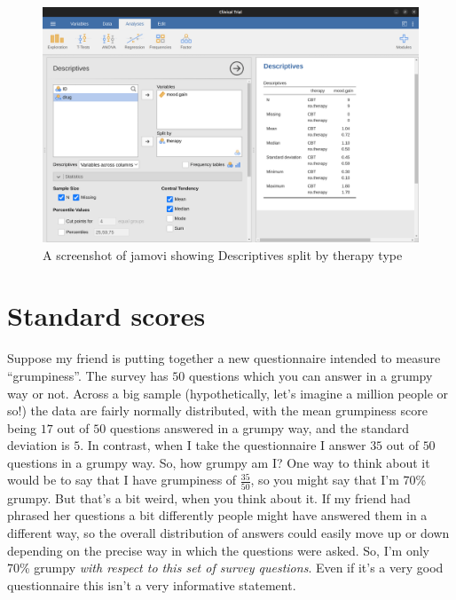 \documentclass[
  a4paper,
]{book}
\begin{document}
\begin{figure}

\includegraphics[width=1\textwidth,height=\textheight]{images/fig4-14.png} \hfill{}

\caption{\label{fig-fig4-14}A screenshot of jamovi showing Descriptives
split by therapy type}

\end{figure}

\hypertarget{sec-Standard-scores}{%
\section{Standard scores}\label{sec-Standard-scores}}

Suppose my friend is putting together a new questionnaire intended to
measure ``grumpiness''. The survey has \(50\) questions which you can
answer in a grumpy way or not. Across a big sample (hypothetically,
let's imagine a million people or so!) the data are fairly normally
distributed, with the mean grumpiness score being \(17\) out of \(50\)
questions answered in a grumpy way, and the standard deviation is \(5\).
In contrast, when I take the questionnaire I answer \(35\) out of \(50\)
questions in a grumpy way. So, how grumpy am I? One way to think about
it would be to say that I have grumpiness of \(\frac{35}{50}\), so you
might say that I'm 70\% grumpy. But that's a bit weird, when you think
about it. If my friend had phrased her questions a bit differently
people might have answered them in a different way, so the overall
distribution of answers could easily move up or down depending on the
precise way in which the questions were asked. So, I'm only 70\% grumpy
\emph{with respect to this set of survey questions}. Even if it's a very
good questionnaire this isn't a very informative statement.
\end{document}
